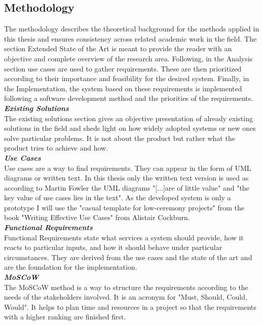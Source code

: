 \subsection{Methodology}
The methodology describes the theoretical background for the methods applied in this thesis and ensures consistency across related academic work in the field.
The section Extended State of the Art is meant to provide the reader with an objective and complete overview of the research area. Following, in the Analysis section use cases are used to gather requirements. These are then prioritized according to their importance and feasibility for the desired system. Finally, in the Implementation, the system based on these requirements is implemented following a software development method and the priorities of the requirements.\\[5mm]
\textbf{\textit{Existing Solutions}}\\
The existing solutions section gives an objective presentation of already existing solutions in the field and sheds light on how widely adopted systems or new ones solve particular problems. It is not about the product but rather what the product tries to achieve and how.\\[5mm]
\textbf{\textit{Use Cases}}\\
Use cases are a way to find requirements\cite{UseCase94Fowler:online}. They can appear in the form of UML diagrams or written text. In this thesis only the written text version is used as according to Martin Fowler the UML diagrams "[...]are of little value" and "the key value of use cases lies in the text"\cite{UseCase94Fowler:online}. As the developed system is only a prototype I will use the "casual template for low-ceremony projects" from the book "Writing Effective Use Cases" from Alistair Cockburn\cite{cockburn2000writingUseCases}.\\[5mm]
\textbf{\textit{Functional Requirements}}\\
Functional Requirements state what services a system should provide, how it reacts to particular inputs, and how it should behave under particular circumstances\cite{sommerville2011software}. They are derived from the use cases and the state of the art and are the foundation for the implementation.\\[5mm]
\textbf{\textit{MoSCoW}}\\
The MoSCoW method is a way to structure the requirements according to the needs of the stakeholders involved\cite{sommerville2011software}. It is an acronym for "Must, Should, Could, Would". It helps to plan time and resources in a project so that the requirements with a higher ranking are finished first.\\[5mm]
